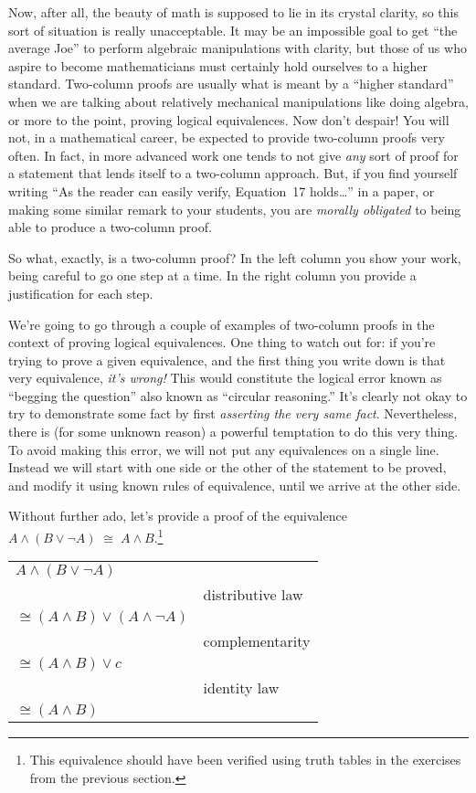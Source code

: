\documentclass[10pt,]{book}
\theoremstyle{plain}
\theoremstyle{definition}
\theoremstyle{definition}
\numberwithin{equation}{section}
\begin{document}
    Now, after all, the beauty of math is supposed to lie in its crystal clarity,
    so this sort of situation is really unacceptable. It may be an impossible
    goal to get ``the average Joe'' to perform algebraic manipulations with
    clarity, but those of us who aspire to become mathematicians must certainly
    hold ourselves to a higher standard. Two-column proofs are usually what
    is meant by a ``higher standard'' when we are talking about relatively
    mechanical manipulations \textemdash{} like doing algebra, or more to the point,
    proving logical equivalences. Now don't despair! You will not, in
    a mathematical career, be expected to provide two-column proofs very
    often. In fact, in more advanced work one tends to not give \emph{any} sort
    of proof for a statement that lends itself to a two-column approach. But,
    if you find yourself writing ``As the reader can easily verify, Equation~17 holds\dots{}'' in a paper, or making some similar remark to your students,
    you are \emph{morally obligated} to being able to produce a two-column proof.
\par

    So what, exactly, is a two-column proof? In the left column you show your
    work, being careful to go one step at a time. In the right column you
    provide a justification for each step.
\par

    We're going to go through a couple of examples of two-column proofs
    in the context of proving logical equivalences. One thing to watch out
    for: if you're trying to prove a given equivalence, and the first thing
    you write down is that very equivalence, \emph{it's wrong!} This
    would constitute the logical error known as
    ``begging the question''
    also known as ``circular reasoning.''
    It's clearly not okay to try
    to demonstrate some fact by first \emph{asserting the very same fact}.
    Nevertheless, there is (for some unknown reason) a powerful temptation
    to do this very thing. To avoid making this error, we will not
    put any equivalences on a single line. Instead we will start with
    one side or the other of the statement to be proved, and modify it
    using known rules of equivalence, until we arrive at the other side.
\par

    Without further ado, let's provide a proof of the equivalence
    \(A \land (B \lor {\lnot}A) \; \cong \; A \land B\).\footnote{This equivalence should have been verified using truth tables in the exercises from the previous
    section.\label{fn-14}}
\begin{tabular}{ll}
\(A \land (B \lor {\lnot}A)\)&\tabularnewline[0pt]
&distributive law\tabularnewline[0pt]
\(\cong (A \land B) \lor (A \land {\lnot}A)\)&\tabularnewline[0pt]
&complementarity\tabularnewline[0pt]
\(\cong (A \land B) \lor c\)&\tabularnewline[0pt]
&identity law\tabularnewline[0pt]
\(\cong (A \land B)\)&
\end{tabular}
\par
\end{document}
